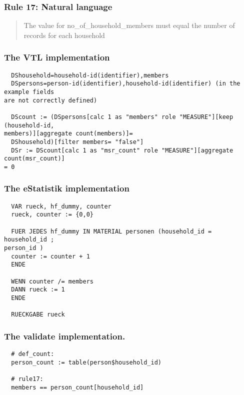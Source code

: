 \newpage

\subsubsection*{  Rule 17: Natural language}
\begin{quote}


The value for no\_of\_household\_members must equal the number of records for each household


\end{quote}
\subsubsection*{The VTL implementation}
\begin{verbatim}
  DShousehold=household-id(identifier),members
  DSpersons=person-id(identifier),household-id(identifier) (in the example fields
are not correctly defined)

  DScount := (DSpersons[calc 1 as "members" role "MEASURE"][keep (household-id,
members)][aggregate count(members)]=
  DShousehold)[filter members= "false"]
  DSr := DScount[calc 1 as "msr_count" role "MEASURE"][aggregate count(msr_count)]
= 0

\end{verbatim}
\subsubsection*{The eStatistik implementation}
\begin{verbatim}
  VAR rueck, hf_dummy, counter
  rueck, counter := {0,0}

  FUER JEDES hf_dummy IN MATERIAL personen (household_id = household_id ;
person_id )
  counter := counter + 1
  ENDE

  WENN counter /= members
  DANN rueck := 1
  ENDE

  RUECKGABE rueck
\end{verbatim}
\subsubsection*{The validate implementation.}
\begin{verbatim}
  # def_count:
  person_count := table(person$household_id)

  # rule17:
  members == person_count[household_id]
\end{verbatim}


\newpage

